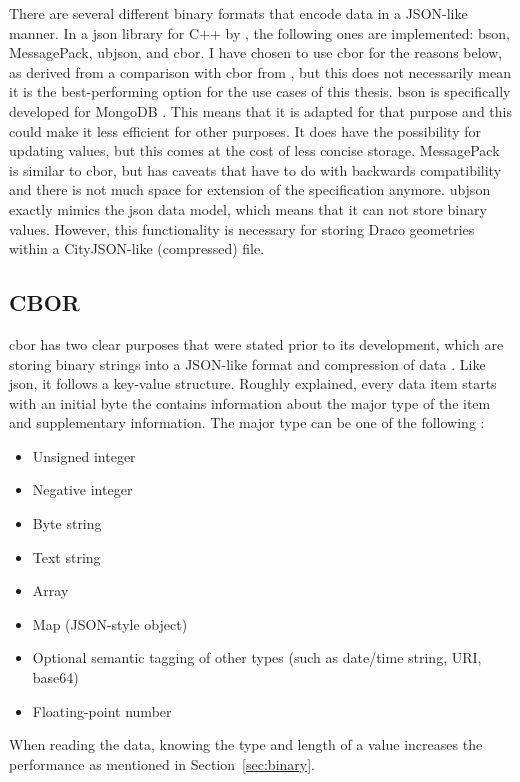 There are several different binary formats that encode data in a JSON-like manner.
In a \ac{json} library for C++ by \citet{nlohmann}, the following ones are implemented: \ac{bson}, MessagePack, \ac{ubjson}, and \ac{cbor}.
I have chosen to use \ac{cbor} for the reasons below, as derived from a comparison with \ac{cbor} from \citet{cborspecs}, but this does not necessarily mean it is the best-performing option for the use cases of this thesis.
\ac{bson} is specifically developed for MongoDB \citep{MongoDB2020}.
This means that it is adapted for that purpose and this could make it less efficient for other purposes.
It does have the possibility for updating values, but this comes at the cost of less concise storage.
MessagePack is similar to \ac{cbor}, but has caveats that have to do with backwards compatibility and there is not much space for extension of the specification anymore.
\ac{ubjson} exactly mimics the \ac{json} data model, which means that it can not store binary values.
However, this functionality is necessary for storing Draco geometries within a CityJSON-like (compressed) file.





\subsection{CBOR}
\label{sec:cbor}
\ac{cbor} has two clear purposes that were stated prior to its development, which are storing binary strings into a JSON-like format and compression of data \citep{cborurl}.
Like \ac{json}, it follows a key-value structure. 
Roughly explained, every data item starts with an initial byte the contains information about the major type of the item and supplementary information.
The major type can be one of the following \citep{cborspecs}:
\begin{itemize}
\item Unsigned integer
\item Negative integer
\item Byte string
\item Text string
\item Array
\item Map (JSON-style object)
\item Optional semantic tagging of other types (such as date/time string, URI, base64)
\item Floating-point number
\end{itemize}

When reading the data, knowing the type and length of a value increases the performance as mentioned in Section~\ref{sec:binary}.
